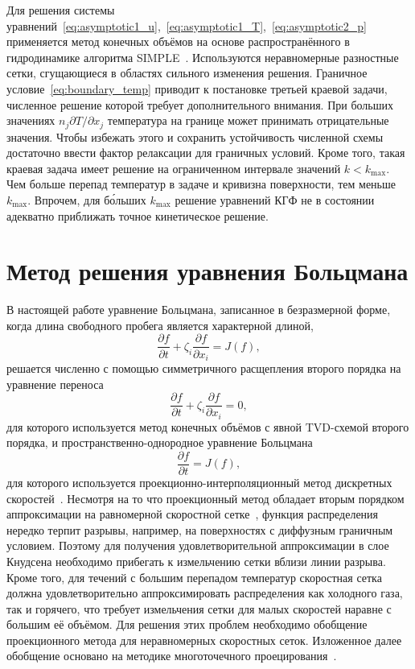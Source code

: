 \documentclass[
aps,%
12pt,%
final,%
notitlepage,%
oneside,%
onecolumn,%
nobibnotes,%
nofootinbib,%
superscriptaddress,%
noshowpacs,%
showkeys,%
centertags]%
{revtex4}
\newcommand{\pder}[2][]{\frac{\partial#1}{\partial#2}}
\newcommand{\Pder}[2][]{\partial#1/\partial#2}
\begin{document}
Для решения системы уравнений~\eqref{eq:asymptotic1_u},~\eqref{eq:asymptotic1_T},~\eqref{eq:asymptotic2_p}
применяется метод конечных объёмов на основе распространённого в гидродинамике алгоритма SIMPLE~\cite{Aoki2007}.
Используются неравномерные разностные сетки, сгущающиеся в областях сильного изменения решения.
Граничное условие~\eqref{eq:boundary_temp} приводит к постановке третьей краевой задачи,
численное решение которой требует дополнительного внимания.
При больших значениях \(n_j\Pder[T]{x_j}\) температура на границе может принимать отрицательные значения.
Чтобы избежать этого и сохранить устойчивость численной схемы достаточно ввести фактор релаксации для граничных условий.
Кроме того, такая краевая задача имеет решение на ограниченном интервале значений \(k<k_{\max}\).
Чем больше перепад температур в задаче и кривизна поверхности, тем меньше \(k_{\max}\).
Впрочем, для б\'{о}льших \(k_{\max}\) решение уравнений КГФ не в состоянии адекватно приближать
точное кинетическое решение.

\section{Метод решения уравнения Больцмана}

В настоящей работе уравнение Больцмана, записанное в безразмерной форме,
когда длина свободного пробега является характерной длиной,
\begin{equation}\label{eq:split_transport}
    \pder[f]{t} + \zeta_i\pder[f]{x_i} = J(f),
\end{equation}
решается численно с помощью симметричного расщепления второго порядка на уравнение переноса
\begin{equation}\label{eq:split_transport}
    \pder[f]{t} + \zeta_i\pder[f]{x_i} = 0,
\end{equation}
для которого используется метод конечных объёмов с явной TVD-схемой второго порядка,
и пространственно-однородное уравнение Больцмана
\begin{equation}\label{eq:split_collisions}
    \pder[f]{t} = J(f),
\end{equation}
для которого используется проекционно-интерполяционный
метод дискретных скоростей~\cite{Tcheremissine1997, Tcheremissine2006, Dodulad2015}.
Несмотря на то что проекционный метод обладает вторым порядком аппроксимации
на равномерной скоростной сетке~\cite{Anikin2012},
функция распределения нередко терпит разрывы, например, на поверхностях с диффузным граничным условием.
Поэтому для получения удовлетворительной аппроксимации в слое Кнудсена необходимо прибегать
к измельчению сетки вблизи линии разрыва.
Кроме того, для течений с большим перепадом температур скоростная сетка должна удовлетворительно аппроксимировать
распределения как холодного газа, так и горячего, что требует измельчения сетки для малых скоростей
наравне с большим её объёмом.
Для решения этих проблем необходимо обобщение проекционного метода для неравномерных скоростных сеток.
Изложенное далее обобщение основано на методике многоточечного проецирования~\citep{Dodulad2012}.
\end{document}
